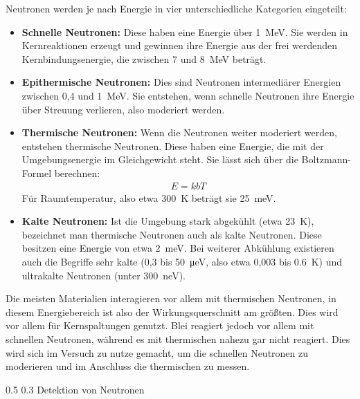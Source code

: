 \documentclass[german, %
parskip=full, %
bibliography=totoc, %
]{scrartcl}
\makeatletter
\renewcommand\subsection{\@startsection 
   {subsection}{2}{0mm}%
   {0.5\baselineskip}%
   {0.3\baselineskip}%
   {\bfseries\sffamily\large}%
   }
\makeatother
\begin{document}
Neutronen werden je nach Energie in vier unterschiedliche Kategorien eingeteilt:
\begin{itemize}
\item	\textbf{Schnelle Neutronen:} Diese haben eine Energie über \SI{1}{\mega\electronvolt}. Sie werden in Kernreaktionen erzeugt und gewinnen ihre Energie aus der frei werdenden Kernbindungsenergie, die zwischen 7 und \SI{8}{\mega\electronvolt} beträgt.
\item	\textbf{Epithermische Neutronen:} Dies sind Neutronen intermediärer Energien zwischen 0,4 und \SI{1}{\mega\electronvolt}. Sie entstehen, wenn schnelle Neutronen ihre Energie über Streuung verlieren, also moderiert werden.
\item	\textbf{Thermische Neutronen:} Wenn die Neutronen weiter moderiert werden, entstehen thermische Neutronen. Diese haben eine Energie, die mit der Umgebungsenergie im Gleichgewicht steht. Sie lässt sich über die Boltzmann-Formel berechnen:
\begin{align}
	E = kbT	
\end{align}
Für Raumtemperatur, also etwa \SI{300}{\kelvin} beträgt sie \SI{25}{\milli\electronvolt}.
\item \textbf{Kalte Neutronen:} Ist die Umgebung stark abgekühlt (etwa \SI{23}{\kelvin}), bezeichnet man thermische Neutronen auch als kalte Neutronen. Diese besitzen eine Energie von etwa \SI{2}{\milli\electronvolt}. Bei weiterer Abkühlung existieren auch die Begriffe sehr kalte (0,3 bis \SI{50}{\micro\electronvolt}, also etwa 0,003 bis \SI{0.6}{\kelvin}) und ultrakalte Neutronen (unter \SI{300}{\nano\electronvolt}).
\end{itemize}
Die meisten Materialien interagieren vor allem mit thermischen Neutronen, in diesem Energiebereich ist also der Wirkungsquerschnitt am größten. Dies wird vor allem für Kernspaltungen genutzt. Blei reagiert jedoch vor allem mit schnellen Neutronen, während es mit thermischen nahezu gar nicht reagiert. Dies wird sich im Versuch zu nutze gemacht, um die schnellen Neutronen zu moderieren und im Anschluss die thermischen zu messen.

\subsection{Detektion von Neutronen}
\end{document}
